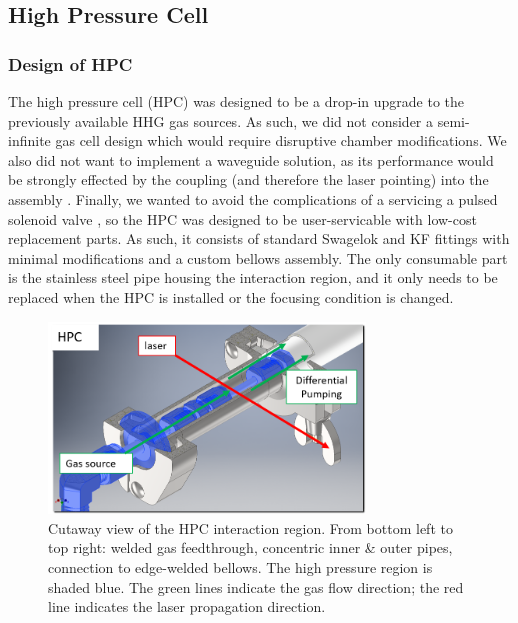 \subsection{High Pressure Cell}
\label{sec:HPC}

\subsubsection{Design of HPC}

The high pressure cell (HPC) was designed to be a drop-in upgrade to the previously available HHG gas sources. As such, we did not consider a semi-infinite gas cell design which would require disruptive chamber modifications. We also did not want to implement a waveguide solution, as its performance would be strongly effected by the coupling (and therefore the laser pointing) into the assembly \cite{popmintchevExtendedPhaseMatching2008,popmintchevPhaseMatchingHigh2009}. Finally, we wanted to avoid the complications of a servicing a pulsed solenoid valve \cite{evenEvenLavieValveSource2015}, so the HPC was designed to be user-servicable with low-cost replacement parts. As such, it consists of standard Swagelok and KF fittings with minimal modifications and a custom bellows assembly. The only consumable part is the stainless steel pipe housing the interaction region, and it only needs to be replaced when the HPC is installed or the focusing condition is changed.

\begin{figure}
	\centering
	\includegraphics[width=0.75\textwidth]{figures/chap3/HPC_cutaway2.png}
	\caption{Cutaway view of the HPC interaction region. From bottom left to top right: welded gas feedthrough, concentric inner \& outer pipes, connection to edge-welded bellows. The high pressure region is shaded blue. The green lines indicate the gas flow direction; the red line indicates the laser propagation direction.}
	\label{fig:HPC_cutaway2}
\end{figure}

